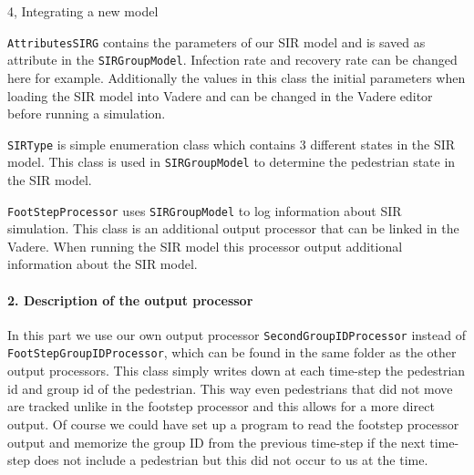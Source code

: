 \begin{task}{4, Integrating a new model}
\begin{description}
    \item \verb+AttributesSIRG+ contains the parameters of our SIR model and is saved as attribute in the \verb+SIRGroupModel+. Infection rate and recovery rate can be changed here for example. Additionally the values in this class the initial parameters when loading the SIR model into Vadere and can be changed in the Vadere editor before running a simulation.
    \item \verb+SIRType+ is simple enumeration class which contains 3 different states in the SIR model. This class is used in \verb+SIRGroupModel+ to determine the pedestrian state in the SIR model.
    \item \verb+FootStepProcessor+ uses \verb+SIRGroupModel+ to log information about SIR simulation. This class is an additional output processor that can be linked in the Vadere. When running the SIR model this processor output additional information about the SIR model.
\end{description}


\paragraph{2. Description of the output processor}
In this part we use our own output processor \verb+SecondGroupIDProcessor+ instead of \verb+FootStepGroupIDProcessor+, which can be found in the same folder as the other output processors. This class simply writes down at each time-step the pedestrian id and group id of the pedestrian. This way even pedestrians that did not move are tracked unlike in the footstep processor and this allows for a more direct output. Of course we could have set up a program to read the footstep processor output and memorize the group ID from the previous time-step if the next time-step does not include a pedestrian but this did not occur to us at the time.


\end{task}
